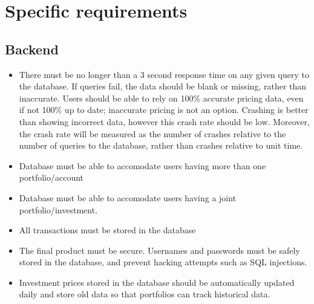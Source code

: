 \documentclass[onecolumn, draftclsnofoot,10pt, compsoc]{IEEEtran}
\begin{document}
\section{Specific requirements}

\subsection{Backend}

\begin{itemize}
\item There must be no longer than a 3 second response time on any given query to the database. If queries fail, the data should be blank or missing, 
		rather than inaccurate. Users should be able to rely on 100\% accurate pricing data, even if not 100\% up to date; inaccurate pricing is not an option. Crashing is better than showing incorrect data, however this crash rate should be low. Moreover, the crash rate will be measured as the number of crashes relative to the number of queries to the database, rather than crashes relative to unit time.

\item Database must be able to accomodate users having more than one portfolio/account
\item Database must be able to accomodate users having a joint portfolio/investment.
\item All transactions must be stored in the database
\item The final product must be secure. Usernames and passwords must be safely stored in the database, and prevent hacking attempts such as SQL injections.
\item Investment prices stored in the database should be automatically updated daily and store old data so that portfolios can track historical data.
\end{itemize}
\end{document}
